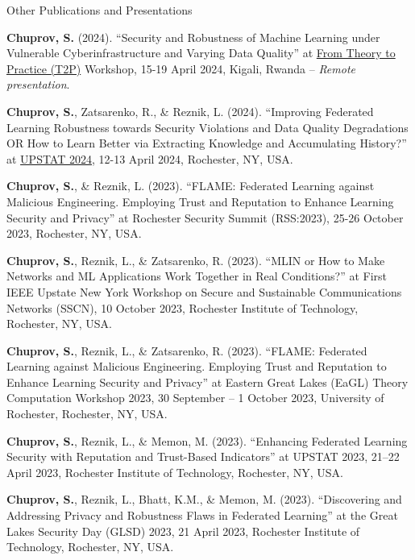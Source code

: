 \begin{rSection}{Other Publications and Presentations}
\begin{enumerate}[label={[NP\arabic*]}, itemsep=-0.5em]
\item \textbf{Chuprov, S.} (2024). ``Security and Robustness of Machine Learning under Vulnerable Cyberinfrastructure and Varying Data Quality'' at \href{https://community.amstat.org/rochester/events/upstats-2024}{From Theory to Practice (T2P)} Workshop, 15-19 April 2024, Kigali, Rwanda -- \textit{Remote presentation}.

\item \textbf{Chuprov, S.}, Zatsarenko, R., \& Reznik, L. (2024). ``Improving Federated Learning Robustness towards Security Violations and Data Quality Degradations OR How to Learn Better via Extracting Knowledge and Accumulating History?'' at \href{https://community.amstat.org/rochester/events/upstats-2024}{UPSTAT 2024}, 12-13 April 2024, Rochester, NY, USA.

\item \textbf{Chuprov, S.}, \& Reznik, L. (2023). ``FLAME: Federated Learning against Malicious Engineering. Employing Trust and Reputation to Enhance Learning Security and Privacy'' at Rochester Security Summit (RSS:2023), 25-26 October 2023, Rochester, NY, USA.

\item \textbf{Chuprov, S.}, Reznik, L., \& Zatsarenko, R. (2023). ``MLIN or How to Make Networks and ML Applications Work Together in Real Conditions?'' at First IEEE Upstate New York Workshop on Secure and Sustainable Communications Networks (SSCN), 10 October 2023,  Rochester Institute of Technology, Rochester, NY, USA.

\item \textbf{Chuprov, S.}, Reznik, L., \& Zatsarenko, R. (2023). ``FLAME: Federated Learning against Malicious Engineering. Employing Trust and Reputation to Enhance Learning Security and Privacy'' at Eastern Great Lakes (EaGL) Theory Computation Workshop 2023, 30 September -- 1 October 2023, University of Rochester, Rochester, NY, USA.


\item \textbf{Chuprov, S.}, Reznik, L., \& Memon, M. (2023). ``Enhancing Federated Learning Security with Reputation and Trust-Based Indicators'' at UPSTAT 2023, 21--22 April 2023, Rochester Institute of Technology, Rochester, NY, USA.

\item \textbf{Chuprov, S.}, Reznik, L., Bhatt, K.M., \& Memon, M. (2023). ``Discovering and Addressing Privacy and Robustness Flaws in Federated Learning'' at the Great Lakes Security Day (GLSD) 2023, 21 April 2023, Rochester Institute of Technology, Rochester, NY, USA.


\end{enumerate}
\end{rSection}
